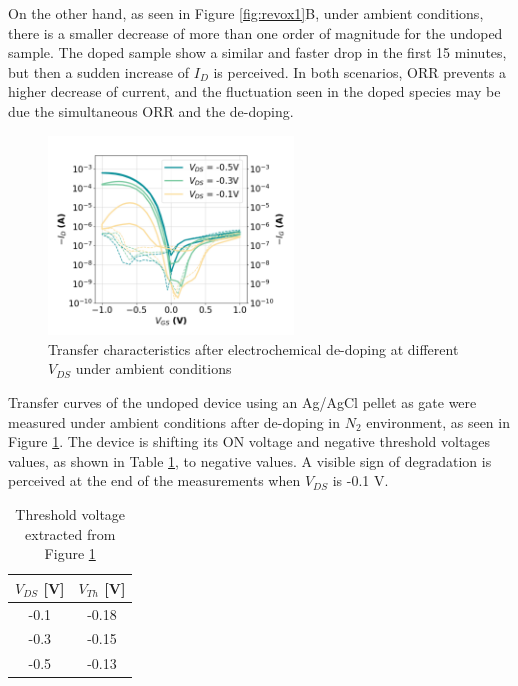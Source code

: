 On the other hand, as seen in Figure \ref{fig:revox1}B, under ambient conditions, there is a smaller decrease of more than one order of magnitude for the undoped sample. The doped sample show a similar and faster drop in the first 15 minutes, but then a sudden increase of $I_{D}$ is perceived. In both scenarios, ORR prevents a higher decrease of current, and the fluctuation seen in the doped species may be due the simultaneous ORR and the de-doping. %

\begin{figure}[ht]
    \centering
    \includegraphics[width=6.5cm]{Images/pdf/revox_transfer_loop2.pdf}%
    \caption[Transfer characteristics after electrochemical de-doping]{Transfer characteristics after electrochemical de-doping at different $V_{DS}$ under ambient conditions}
    \label{fig:transrevox1}
\end{figure}

Transfer curves of the undoped device using an Ag/AgCl pellet as gate were measured under ambient conditions after de-doping in $N_{2}$ environment, as seen in Figure \ref{fig:transrevox1}. The device is shifting its ON voltage and negative threshold voltages values, as shown in Table \ref{tab:vth_air}, to negative values. A visible sign of degradation is perceived at the end of the measurements when $V_{DS}$ is -0.1 V.

\begin{table}[ht]
\centering
\caption{Threshold voltage extracted from Figure \ref{fig:transrevox1}}
\begin{tabular}{c|c}
 $V_{DS}$ [V] & $V_{Th}$ [V] \\\hline
-0.1 & -0.18 \\
-0.3 & -0.15 \\
-0.5 & -0.13 \\ \hline
\end{tabular}
\label{tab:vth_air}
\end{table}

